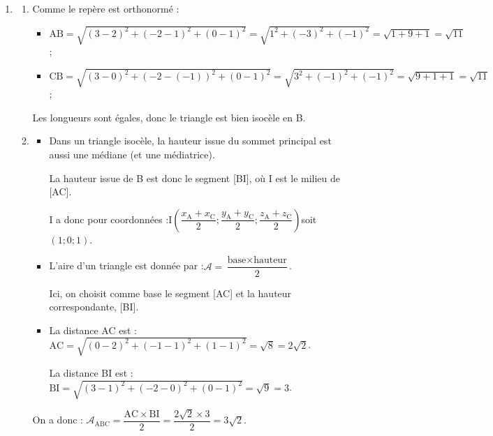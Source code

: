 \documentclass[10pt]{article}
\begin{document}
\begin{enumerate}
	$\begin{aligned}[t]
		t_0 - (-t_0) + 4(2 + 4t_0) - 5 = 0
		&\iff t_0 + t_0 + 8 + 16t_0 - 5 = 0\\
		&\iff 18t_0 = -3\\
		&\iff t_0 = \dfrac{-1}{6}
	\end{aligned}$

	Le point H a donc pour coordonnées :\quad $\left(\dfrac{-1}{6} ; - \dfrac{-1}{6} ; 2 + 4\times \dfrac{-1}{6}\right)$\quad  soit $\mathrm{H}\left(-\dfrac{1}{6} ; \dfrac{1}{6} ; \dfrac{4}{3}\right) $.
	\item \begin{enumerate}
		\item Comme le repère est orthonormé :
		\begin{itemize}
			\item $\mathrm{AB} = \sqrt{(3 - 2)^2 + (-2 - 1)^2 + (0 - 1)^2} = \sqrt{1^2 + (-3)^2 + (-1)^2} = \sqrt{1 + 9 + 1} = \sqrt{11}$;
			\item $\mathrm{CB} = \sqrt{(3 - 0)^2 + (-2 - (-1))^2 + (0 - 1)^2} = \sqrt{3^2 + (-1)^2 + (-1)^2} = \sqrt{ 9 + 1 + 1} = \sqrt{11}$;
		\end{itemize}
		Les longueurs sont égales, donc le triangle est bien isocèle en B.

		\item \begin{itemize}
			\item Dans un triangle isocèle, la hauteur issue du sommet principal est aussi une médiane (et une médiatrice).

			La hauteur issue de B est donc le segment [BI], où I est le milieu de [AC].

			I a donc pour coordonnées :\quad I$\left(\dfrac{x_{\mathrm{A}} + x_{\mathrm{C}}}{2} ; \dfrac{y_{\mathrm{A}} + y_{\mathrm{C}}}{2} ; \dfrac{z_{\mathrm{A}} + z_{\mathrm{C}}}{2}\right) $\quad soit \quad $(1 ; 0 ; 1)$.

			\item L'aire d'un triangle est donnée par :\quad $\mathcal{A} = \dfrac{\text{base} \times \text{hauteur}
			}{2}$.

			Ici, on choisit comme base le segment [AC] et la hauteur correspondante, [BI].

			\item La distance AC est :\quad $\mathrm{AC} = \sqrt{(0 - 2)^2 + (-1 - 1)^2 + (1 - 1)^2} = \sqrt{8} = 2\sqrt{2}$.

			La distance BI est :\quad $\mathrm{BI} = \sqrt{(3 - 1)^2 + (-2 - 0)^2 + (0 - 1)^2} = \sqrt{9} = 3$.
		\end{itemize}
		On a donc : \quad $\mathcal{A}_{\mathrm{ABC}} = \dfrac{\mathrm{AC} \times \mathrm{BI}}{2} = \dfrac{2\sqrt{2} \times 3}{2} = 3\sqrt{2}$.
	\end{enumerate}


\end{enumerate}
\end{document}
